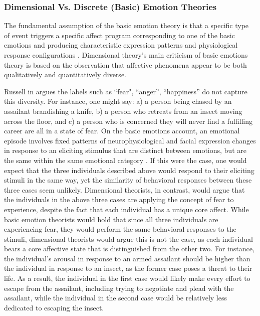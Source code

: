 \documentclass[12pt]{report}
\begin{document}
\subsubsection{Dimensional Vs. Discrete (Basic) Emotion Theories}

The fundamental assumption of the basic emotion theory is that a specific type
of event triggers a specific affect program corresponding to one of the basic
emotions and producing characteristic expression patterns and physiological
response configurations \cite{scherer:emotions-emergent}. Dimensional theory's
main criticism of basic emotions theory is based on the observation that
affective phenomena appear to be both qualitatively and quantitatively diverse.

Russell in \cite{russell:core-affect} argues the labels such as ``fear",
``anger'', ``happiness'' do not capture this diversity. For instance, one might
say: a) a person being chased by an assailant brandishing a knife, b) a person
who retreats from an insect moving across the floor, and c) a person who is
concerned they will never find a fulfilling career are all in a state of
fear. On the basic emotions account, an emotional episode involves fixed
patterns of neurophysiological and facial expression changes in response to an
eliciting stimulus that are distinct between emotions, but are the same within
the same emotional category \cite{ekman:argument-emotions}. If this were the
case, one would expect that the three individuals described above would respond
to their eliciting stimuli in the same way, yet the similarity of behavioral
responses between these three cases seem unlikely. Dimensional theorists, in
contrast, would argue that the individuals in the above three cases are applying
the concept of fear to experience, despite the fact that each individual has a
unique core affect. While basic emotion theorists would hold that since all
three individuals are experiencing fear, they would perform the same behavioral
responses to the stimuli, dimensional theorists would argue this is not the
case, as each individual bears a core affective state that is distinguished from
the other two. For instance, the individual's arousal in response to an armed
assailant should be higher than the individual in response to an insect, as the
former case poses a threat to their life. As a result, the individual in the
first case would likely make every effort to escape from the assailant,
including trying to negotiate and plead with the assailant, while the individual
in the second case would be relatively less dedicated to escaping the insect. 
\end{document}
